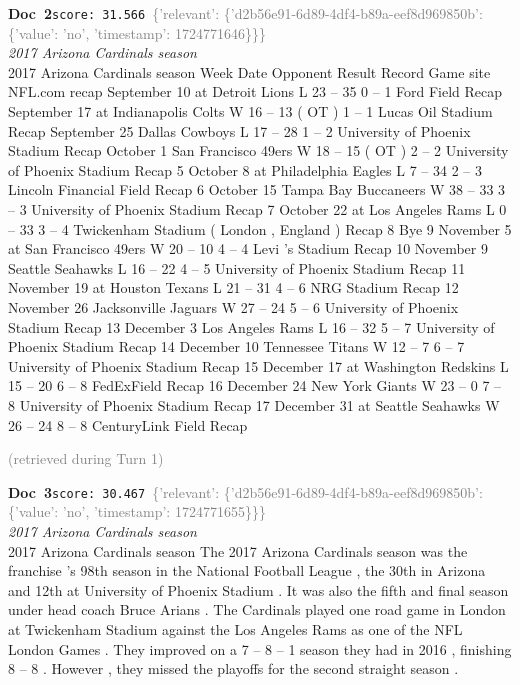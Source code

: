 \documentclass[a4paper,11pt]{article}
\begin{document}
\begin{docenv}
{\footnotesize\textcolor{doccolor}{\textbf{Doc~2}}}\hfill{\tiny\texttt{score:~31.566}}\ {\tiny\textcolor{gray}{\{'relevant': \{'d2b56e91-6d89-4df4-b89a-eef8d969850b': \{'value': 'no', 'timestamp': 1724771646\}\}\}}}\\[3pt]
{\small\textit{2017 Arizona Cardinals season}}\\[2pt]
\vspace{2pt}
{\footnotesize 2017 Arizona Cardinals season
Week Date Opponent Result Record Game site NFL.com recap September 10 at Detroit Lions L 23 -- 35 0 -- 1 Ford Field Recap September 17 at Indianapolis Colts W 16 -- 13 ( OT ) 1 -- 1 Lucas Oil Stadium Recap September 25 Dallas Cowboys L 17 -- 28 1 -- 2 University of Phoenix Stadium Recap October 1 San Francisco 49ers W 18 -- 15 ( OT ) 2 -- 2 University of Phoenix Stadium Recap 5 October 8 at Philadelphia Eagles L 7 -- 34 2 -- 3 Lincoln Financial Field Recap 6 October 15 Tampa Bay Buccaneers W 38 -- 33 3 -- 3 University of Phoenix Stadium Recap 7 October 22 at Los Angeles Rams L 0 -- 33 3 -- 4 Twickenham Stadium ( London , England ) Recap 8 Bye 9 November 5 at San Francisco 49ers W 20 -- 10 4 -- 4 Levi 's Stadium Recap 10 November 9 Seattle Seahawks L 16 -- 22 4 -- 5 University of Phoenix Stadium Recap 11 November 19 at Houston Texans L 21 -- 31 4 -- 6 NRG Stadium Recap 12 November 26 Jacksonville Jaguars W 27 -- 24 5 -- 6 University of Phoenix Stadium Recap 13 December 3 Los Angeles Rams L 16 -- 32 5 -- 7 University of Phoenix Stadium Recap 14 December 10 Tennessee Titans W 12 -- 7 6 -- 7 University of Phoenix Stadium Recap 15 December 17 at Washington Redskins L 15 -- 20 6 -- 8 FedExField Recap 16 December 24 New York Giants W 23 -- 0 7 -- 8 University of Phoenix Stadium Recap 17 December 31 at Seattle Seahawks W 26 -- 24 8 -- 8 CenturyLink Field Recap}
\end{docenv}
\hfill{\tiny\textcolor{gray}{(retrieved during Turn 1)}}
\begin{docenv}
{\footnotesize\textcolor{doccolor}{\textbf{Doc~3}}}\hfill{\tiny\texttt{score:~30.467}}\ {\tiny\textcolor{gray}{\{'relevant': \{'d2b56e91-6d89-4df4-b89a-eef8d969850b': \{'value': 'no', 'timestamp': 1724771655\}\}\}}}\\[3pt]
{\small\textit{2017 Arizona Cardinals season}}\\[2pt]
\vspace{2pt}
{\footnotesize 2017 Arizona Cardinals season
The 2017 Arizona Cardinals season was the franchise 's 98th season in the National Football League , the 30th in Arizona and 12th at University of Phoenix Stadium . It was also the fifth and final season under head coach Bruce Arians . The Cardinals played one road game in London at Twickenham Stadium against the Los Angeles Rams as one of the NFL London Games . They improved on a 7 -- 8 -- 1 season they had in 2016 , finishing 8 -- 8 . However , they missed the playoffs for the second straight season .}
\end{docenv}
\end{document}
